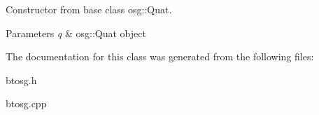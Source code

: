 Constructor from base class osg\+::\+Quat. 


\begin{DoxyParams}{Parameters}
{\em q} & osg\+::\+Quat object \\
\hline
\end{DoxyParams}


The documentation for this class was generated from the following files\+:\begin{DoxyCompactItemize}
\item 
btosg.\+h\item 
btosg.\+cpp\end{DoxyCompactItemize}

